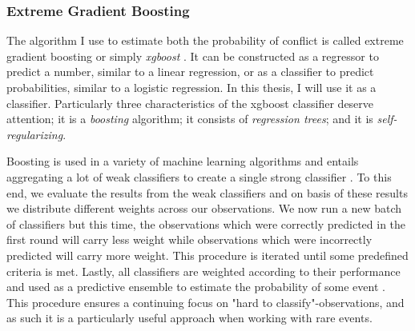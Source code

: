 \documentclass[a4paper]{article}
\begin{document}

\subsubsection{Extreme Gradient Boosting}\label{xgboost}

The algorithm I use to estimate both the probability of conflict is called extreme gradient boosting or simply \emph{xgboost} \citep{Chen_2016}. It can be constructed as a regressor to predict a number, similar to a linear regression, or as a classifier to predict probabilities, similar to a logistic regression. In this thesis, I will use it as a classifier. Particularly three characteristics of the xgboost classifier deserve attention; it is a \emph{boosting} algorithm; it consists of \emph{regression trees}; and it is \emph{self-regularizing}.\par

Boosting is used in a variety of machine learning algorithms and entails aggregating a lot of weak classifiers to create a single strong classifier \citep[337]{Friedman_2001}. To this end, we evaluate the results from the weak classifiers and on basis of these results we distribute different weights across our observations. We now run a new batch of classifiers but this time, the observations which were correctly predicted in the first round will carry less weight while observations which were incorrectly predicted will carry more weight. This procedure is iterated until some predefined criteria is met. Lastly, all classifiers are weighted according to their performance and used as a predictive ensemble to estimate the probability of some event \citep[338-339]{Friedman_2001}. This procedure ensures a continuing focus on "hard to classify"-observations, and as such it is a particularly useful approach when working with rare events.\par
\end{document}
